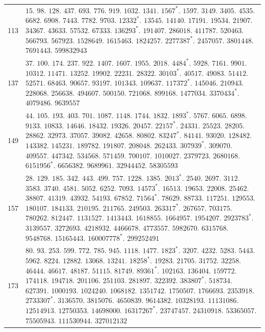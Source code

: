 \begin{longtable}{@{}r|p{\dimexpr\linewidth-38pt\relax}@{}}
113 & $15.$ $98.$ $128.$ $437.$ $693.$ $776.$ $919.$ $1032.$ $1341.$ $1567^{*}.$ $1597.$ $3149.$ $3405.$ $4535.$ $6682.$ $6908.$ $7443.$ $7782.$ $9703.$ $12332^{*}.$ $13545.$ $14140.$ $17191.$ $19534.$ $21907.$ $34367.$ $43633.$ $57532.$ $67333.$ $136293^{*}.$ $191407.$ $286018.$ $411787.$ $520463.$ $566793.$ $567923.$ $1528649.$ $1615463.$ $1824257.$ $2277387^{*}.$ $2457057.$ $3801448.$ $7691443.$ $599832943$\\
137 & $37.$ $100.$ $174.$ $237.$ $922.$ $1407.$ $1607.$ $1955.$ $2018.$ $4484^{*}.$ $5928.$ $7161.$ $9901.$ $10312.$ $11471.$ $13252.$ $19902.$ $22231.$ $28322.$ $30103^{*}.$ $40517.$ $49083.$ $51412.$ $52571.$ $68463.$ $90657.$ $93197.$ $101343.$ $109637.$ $117372^{*}.$ $145046.$ $210943.$ $228068.$ $256638.$ $494607.$ $500150.$ $721068.$ $899168.$ $1477034.$ $3370434^{*}.$ $4079486.$ $9639557$\\
149 & $44.$ $105.$ $193.$ $403.$ $701.$ $1087.$ $1148.$ $1744.$ $1832.$ $1893^{*}.$ $5767.$ $6065.$ $6898.$ $9133.$ $10833.$ $14646.$ $18432.$ $19326.$ $20457.$ $22157^{*}.$ $24331.$ $25523.$ $28205.$ $28862.$ $32973.$ $37057.$ $39082.$ $42658.$ $80802.$ $83247^{*}.$ $84141.$ $93020.$ $128482.$ $143382.$ $145231.$ $189782.$ $191807.$ $208048.$ $262433.$ $307939^{*}.$ $309070.$ $409557.$ $447342.$ $534568.$ $571459.$ $700107.$ $1010027.$ $2379723.$ $2680168.$ $6151956^{*}.$ $6656382.$ $9689961.$ $32944452.$ $58305593$\\
157 & $28.$ $129.$ $185.$ $342.$ $443.$ $499.$ $757.$ $1228.$ $1385.$ $2013^{*}.$ $2540.$ $2697.$ $3112.$ $3583.$ $3740.$ $4581.$ $5052.$ $6252.$ $7093.$ $14573^{*}.$ $16513.$ $19653.$ $22008.$ $25462.$ $38807.$ $41319.$ $43932.$ $54193.$ $67852.$ $71564^{*}.$ $78629.$ $88733.$ $117251.$ $129553.$ $180107.$ $184133.$ $210195.$ $211765.$ $249503.$ $263317^{*}.$ $267657.$ $703175.$ $780262.$ $812447.$ $1131527.$ $1413443.$ $1618855.$ $1664957.$ $1954207.$ $2923783^{*}.$ $3139557.$ $3272693.$ $4218932.$ $4466678.$ $4773557.$ $5982670.$ $6315768.$ $9548768.$ $15165443.$ $160007778^{*}.$ $299252491$\\
173 & $80.$ $93.$ $253.$ $599.$ $772.$ $785.$ $945.$ $1118.$ $1477.$ $1823^{*}.$ $3207.$ $4232.$ $5283.$ $5443.$ $5962.$ $8224.$ $12882.$ $13068.$ $13241.$ $18258^{*}.$ $19283.$ $21705.$ $31752.$ $32258.$ $46444.$ $46617.$ $48187.$ $51115.$ $81749.$ $89361^{*}.$ $102163.$ $136404.$ $159772.$ $174118.$ $194718.$ $201106.$ $251103.$ $281897.$ $322392.$ $383807^{*}.$ $518734.$ $627391.$ $1000193.$ $1024240.$ $1068182.$ $1351742.$ $1750507.$ $1766693.$ $2353918.$ $2733307^{*}.$ $3136570.$ $3815076.$ $4650839.$ $9614382.$ $10328193.$ $11131086.$ $12514913.$ $12750353.$ $14698000.$ $16317267^{*}.$ $23747457.$ $24310918.$ $53365057.$ $75505943.$ $111530944.$ $327012132$\\

\end{longtable}
